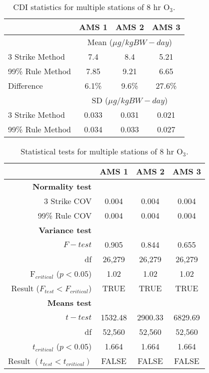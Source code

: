 % 
\begin{table}[!htb]
\centering
\caption{CDI statistics for multiple stations of 8 hr O$_{3}$.}
\label{tb16:CDI-O3}
\begin{tabular}{@{}lccc@{}}
\toprule
 & \textbf{AMS 1} & \textbf{AMS 2} & \textbf{AMS 3} \\ \midrule
 & \multicolumn{3}{c}{Mean ($\mu g/kgBW-day$)} \\
3 Strike Method & 7.4 & 8.4 & 5.21 \\
99\% Rule Method & 7.85 & 9.21 & 6.65 \\
Difference & 6.1\% & 9.6\% & 27.6\% \\
 & \multicolumn{3}{c}{SD ($\mu g/kgBW-day$)} \\
3 Strike Method & 0.033 & 0.031 & 0.021 \\
99\% Rule Method & 0.034 & 0.033 & 0.027 \\ \bottomrule
\end{tabular}
\end{table}

% 
\begin{table}[!htb]
\centering
\caption{Statistical tests for multiple stations of 8 hr O$_{3}$.}
\label{tb17:statmultiO3}
\begin{tabular}{@{}rccc@{}}
\toprule
 & \textbf{AMS 1} & \textbf{AMS 2} & \textbf{AMS 3} \\ \midrule
\textbf{Normality test} &  &  &  \\
3 Strike COV & 0.004 & 0.004 & 0.004 \\
99\% Rule COV & 0.004 & 0.004 & 0.004 \\
\textbf{Variance test} &  &  &  \\
$F-test$ & 0.905 & 0.844 & 0.655 \\
df & 26,279 & 26,279 & 26,279 \\
F$_{critical}$ ($p<0.05$) & 1.02 & 1.02 & 1.02 \\
Result ($F_{test} < F_{critical}$) & TRUE & TRUE & TRUE \\
\textbf{Means test} &  &  &  \\
$t-test$ & 1532.48 & 2900.33 & 6829.69 \\
df & 52,560 & 52,560 & 52,560 \\
$t_{critical}$ ($p<0.05$) & 1.664 & 1.664 & 1.664 \\
Result $(t_{test} < t_{critical})$ & FALSE & FALSE & FALSE \\ \bottomrule
\end{tabular}
\end{table}

